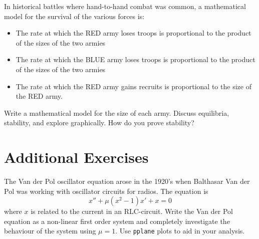 \begin{problem}
    In historical battles where hand-to-hand combat was common, a mathematical model
    for the survival of the various forces is:
    \begin{itemize}
        \item The rate at which the {\color{red} RED} army loses troops is
            proportional to the product of the sizes of the two armies
        \item The rate at which the {\color{blue} BLUE} army loses troops is
            proportional to the product of the sizes of the two armies
        \item The rate at which the {\color{red} RED} army gains recruits is
            proportional to the size of the {\color{red} RED} army.
    \end{itemize}
    Write a mathematical model for the size of each army.  Discuss equilibria, stability,
    and explore graphically. How do you prove stability?
\end{problem}
    \solution{
        \[ \left\{ \begin{array}{ll} R' &= -\alpha RB + \kappa R \\ B' &= -\beta RB \end{array} \right. \]

    }



\newpage\section{Additional Exercises}

\begin{problem}
    The Van der Pol oscillator equation arose in the 1920's when Balthasar Van der Pol was
    working with oscillator circuits for radios.  The equation is
    \[ x'' + \mu (x^2-1) x' + x = 0 \]
    where $x$ is related to the current in an RLC-circuit.  Write the Van der Pol equation
    as a non-linear first order system and completely investigate the behaviour of the system using
    $\mu = 1$.  Use \texttt{pplane} plots to aid in your analysis.
\end{problem}

